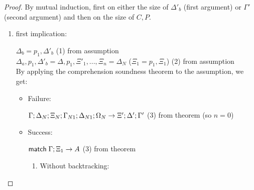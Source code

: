 \begin{proof}
   By mutual induction, first on either the size of $\Delta'_b$ (first argument) or $\Gamma'$ (second argument) and then on the size of $C, P$.
   
   \begin{enumerate}
      \item first implication:
      
      $\Delta_b = p_1, \Delta'_b$ \hfill (1) from assumption \\
      $\Delta_a, p_1, \Delta'_b = \Delta, p_1, \Xi'_1, ..., \Xi_n = \Delta_N$ ($\Xi_1 = p_1, \Xi_1$) \hfill (2) from assumption \\
      By applying the comprehension soundness theorem to the assumption, we get:
      
      \begin{itemize}
         \item Failure:
         
         $\do \Gamma; \Delta_N; \Xi_N; \Gamma_{N1}; \Delta_{N1}; \Omega_N \rightarrow \Xi'; \Delta'; \Gamma'$ \hfill (3) from theorem (so $n = 0$)\\
         
         \item Success:
         
         $\mathsf{match} \; \Gamma; \Xi_1 \rightarrow A$ \hfill (3) from theorem \\
         
         \begin{enumerate}
            \item Without backtracking:
            

\end{enumerate}
\end{itemize}
\end{enumerate}
\end{proof}
